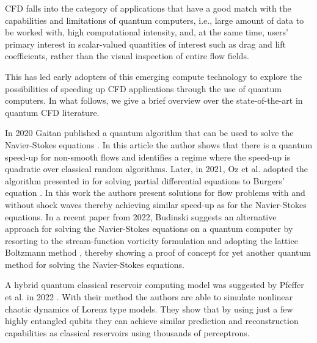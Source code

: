 CFD falls into the category of applications that have a good match with the capabilities and limitations of quantum computers, i.e., large amount of data to be worked with, high computational intensity, and, at the same time, users' primary interest in scalar-valued quantities of interest such as drag and lift coefficients, rather than the visual inspection of entire flow fields.

This has led early adopters of this emerging compute technology to explore the possibilities of speeding up CFD applications through the use of quantum computers. In what follows, we give a brief overview over the state-of-the-art in quantum CFD literature.


In 2020 Gaitan published a quantum algorithm that can be used to solve the Navier-Stokes equations \cite{Gaitan2020}. In this article the author shows that there is a quantum speed-up for non-smooth flows and identifies a regime where the speed-up is quadratic over classical random algorithms.
Later, in 2021, Oz et al. adopted the algorithm presented in \cite{Gaitan2020} for solving partial differential equations to Burgers' equation \cite{Oz2021}. In this work the authors present solutions for flow problems with and without shock waves thereby achieving similar speed-up as for the Navier-Stokes equations. 
In a recent paper from 2022, Budinski suggests an alternative approach for solving the Navier-Stokes equations on a quantum computer by resorting to the stream-function vorticity formulation and adopting the lattice Boltzmann method \cite{Budinski2021}, thereby showing a proof of concept for yet another quantum method for solving the Navier-Stokes equations. 

A hybrid quantum classical reservoir computing model was suggested by Pfeffer et al. in 2022 \cite{Pfeffer2022}. With their method the authors are able to simulate nonlinear chaotic dynamics of Lorenz type models. They show that by using just a few highly entangled qubits they can achieve similar prediction and reconstruction capabilities as classical reservoirs using thousands of perceptrons. 

